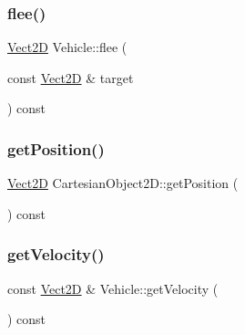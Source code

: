 \mbox{\label{classVehicle_ac7dbbb2942b8d642b2ab071def1c2fdb_ac7dbbb2942b8d642b2ab071def1c2fdb}} 
\subsubsection{\texorpdfstring{flee()}{flee()}}
{\footnotesize\ttfamily \hyperlink{classVect2D}{Vect2D} Vehicle\+::flee (\begin{DoxyParamCaption}\item[{const \hyperlink{classVect2D}{Vect2D} \&}]{target }\end{DoxyParamCaption}) const}

\mbox{\label{classCartesianObject2D_aa3a6b63777852ab9eb9408ed2536abe2_aa3a6b63777852ab9eb9408ed2536abe2}} 
\subsubsection{\texorpdfstring{get\+Position()}{getPosition()}}
{\footnotesize\ttfamily \hyperlink{classVect2D}{Vect2D} Cartesian\+Object2\+D\+::get\+Position (\begin{DoxyParamCaption}{ }\end{DoxyParamCaption}) const\hspace{0.3cm}{\ttfamily [inherited]}}

\mbox{\label{classVehicle_a87b8266cb3495e8444233a0724e1bf07_a87b8266cb3495e8444233a0724e1bf07}} 
\subsubsection{\texorpdfstring{get\+Velocity()}{getVelocity()}}
{\footnotesize\ttfamily const \hyperlink{classVect2D}{Vect2D} \& Vehicle\+::get\+Velocity (\begin{DoxyParamCaption}{ }\end{DoxyParamCaption}) const}

\mbox{\label{classVehicle_a49a29a7ce993a33f78b96e7b368c60fd_a49a29a7ce993a33f78b96e7b368c60fd}} 
